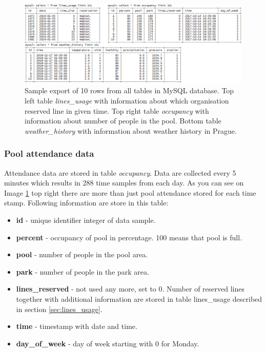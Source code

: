 \documentclass{article}
\begin{document}
\begin{figure}[h!]
\centering
\includegraphics[width=16cm]{imgs/db_export.png}
\caption{Sample export of 10 rows from all tables in MySQL database. Top left table \emph{lines\_usage} with information about which organisation reserved line in given time. Top right table \emph{occupancy} with information about number of people in the pool. Bottom table \emph{weather\_history} with information about weather history in Prague.}
\label{fig:db_export}
\end{figure}

\subsubsection{Pool attendance data}
Attendance data are stored in table \emph{occupancy}. Data are collected every 5 minutes which results in 288 time samples from each day. As you can see on Image \ref{fig:db_export} top right there are more than just pool attendance stored for each time stamp. Following information are store in this table:
\begin{itemize}
    \item \textbf{id} - unique identifier integer of data sample.
    \item \textbf{percent} - occupancy of pool in percentage. 100 means that pool is full. 
    \item \textbf{pool} - number of people in the pool area.
    \item \textbf{park} - number of people in the park area.
    \item \textbf{lines\_reserved} - not used any more, set to 0. Number of reserved lines together with additional information are stored in table lines\_usage described in section \ref{sec:lines_usage}.
    \item \textbf{time} - timestamp with date and time.
    \item \textbf{day\_of\_week} - day of week starting with 0 for Monday.
\end{itemize}
\end{document}
